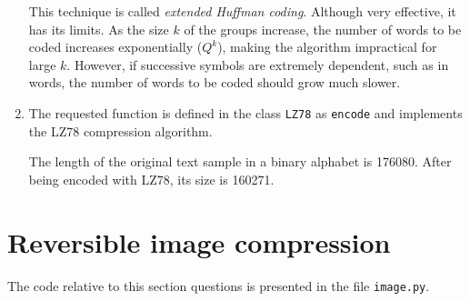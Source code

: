 \documentclass[a4paper, 12pt]{article}
\begin{document}
\begin{enumerate}[leftmargin=*]
        This technique is called \emph{extended Huffman coding}. Although very effective, it has its limits. As the size $k$ of the groups increase, the number of words to be coded increases exponentially ($Q^k$), making the algorithm impractical for large $k$. However, if successive symbols are extremely dependent, such as in words, the number of words to be coded should grow much slower.
        
        
        \item The requested function is defined in the class \texttt{LZ78} as \texttt{encode} and implements the LZ78 \cite{ziv1978compression} compression algorithm.
        
        The length of the original text sample in a binary alphabet is \num{176080}. After being encoded with LZ78, its size is \num{160271}.
    \end{enumerate}
    
    
    \section*{Reversible image compression}
    
    The code relative to this section questions is presented in the file \texttt{image.py}.
    
\end{document}
